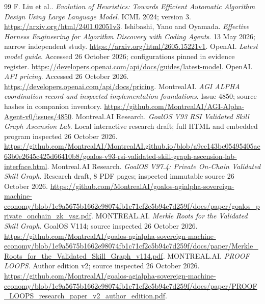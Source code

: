 \begin{thebibliography}{99}
F. Liu et al.. \emph{Evolution of Heuristics: Towards Efficient Automatic Algorithm Design Using Large Language Model}. ICML 2024; version 3. \url{https://arxiv.org/html/2401.02051v3}.
Ishibashi, Yano and Oyamada. \emph{Effective Harness Engineering for Algorithm Discovery with Coding Agents}. 13 May 2026; narrow independent study. \url{https://arxiv.org/html/2605.15221v1}.
OpenAI. \emph{Latest model guide}. Accessed 26 October 2026; configurations pinned in evidence register. \url{https://developers.openai.com/api/docs/guides/latest-model}.
OpenAI. \emph{API pricing}. Accessed 26 October 2026. \url{https://developers.openai.com/api/docs/pricing}.
MontrealAI. \emph{AGI ALPHA coordination record and inspected implementation foundations}. Issue 4850; source hashes in companion inventory. \url{https://github.com/MontrealAI/AGI-Alpha-Agent-v0/issues/4850}.
Montreal.AI Research. \emph{GoalOS V93 RSI Validated Skill Graph Ascension Lab}. Local interactive research draft; full HTML and embedded program inspected 26 October 2026. \url{https://github.com/MontrealAI/MontrealAI.github.io/blob/a9cc143bc05495405ac63b0e2645c425d66410b8/goalos-v93-rsi-validated-skill-graph-ascension-lab-interface.html}.
Montreal.AI Research. \emph{GoalOS V97.4: Private On-Chain Validated Skill Graph}. Research draft, 8 PDF pages; inspected immutable source 26 October 2026. \url{https://github.com/MontrealAI/goalos-agialpha-sovereign-machine-economy/blob/1e9a5675b1662e98074fb1c71cf2c5b94c7d259f/docs/paper/goalos_private_onchain_zk_vsg.pdf}.
MONTREAL.AI. \emph{Merkle Roots for the Validated Skill Graph}. GoalOS V114; source inspected 26 October 2026. \url{https://github.com/MontrealAI/goalos-agialpha-sovereign-machine-economy/blob/1e9a5675b1662e98074fb1c71cf2c5b94c7d259f/docs/paper/Merkle_Roots_for_the_Validated_Skill_Graph_v114.pdf}.
MONTREAL.AI. \emph{PROOF LOOPS}. Author edition v2; source inspected 26 October 2026. \url{https://github.com/MontrealAI/goalos-agialpha-sovereign-machine-economy/blob/1e9a5675b1662e98074fb1c71cf2c5b94c7d259f/docs/paper/PROOF_LOOPS_research_paper_v2_author_edition.pdf}.
\end{thebibliography}
